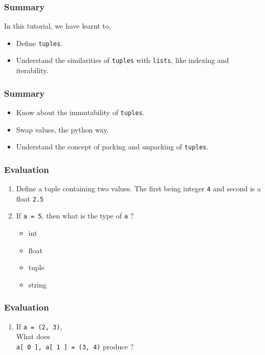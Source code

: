 \documentclass[17pt]{beamer}
\newcounter{saveenumi}
\newcommand{\seti}{\setcounter{saveenumi}{\value{enumi}}}
\newcommand{\conti}{\setcounter{enumi}{\value{saveenumi}}}
\begin{document}
\begin{frame}
\frametitle{Summary}
\label{sec-5.1}

  In this tutorial, we have learnt to,


\begin{itemize}
\item Define \texttt{tuples}.\pause
\item Understand the similarities of \texttt{tuples} with \texttt{lists}, like indexing and 
    iterability.
\end{itemize}
\end{frame}

\begin{frame}
\frametitle{Summary}
\label{sec-5.2}

\begin{itemize}
\item Know about the immutability of \texttt{tuples}.\pause
\item Swap values, the python way.\pause
\item Understand the concept of packing and unpacking of \texttt{tuples}.
\end{itemize}
\end{frame}


\begin{frame}
\frametitle{Evaluation}
\label{sec-6.1}

\begin{enumerate}
\item Define a tuple containing two values. The first being integer \texttt{4} and 
   second is a float \texttt{2.5} \pause
\vspace{8pt}
\item If \texttt{a = 5}, then what is the type of \texttt{a} ?\pause
\begin{itemize}
\item int
\item float
\item tuple
\item string
\end{itemize}
\seti
\end{enumerate}
\end{frame}

\begin{frame}
\frametitle{Evaluation}
\label{sec-6.2}

\begin{enumerate}
\conti
\item If \texttt{a = (2, 3)},\\ What does \\ \texttt{a[ 0 ], a[ 1 ] = (3, 4)} produce ?
\end{enumerate}
\end{frame}
\end{document}
